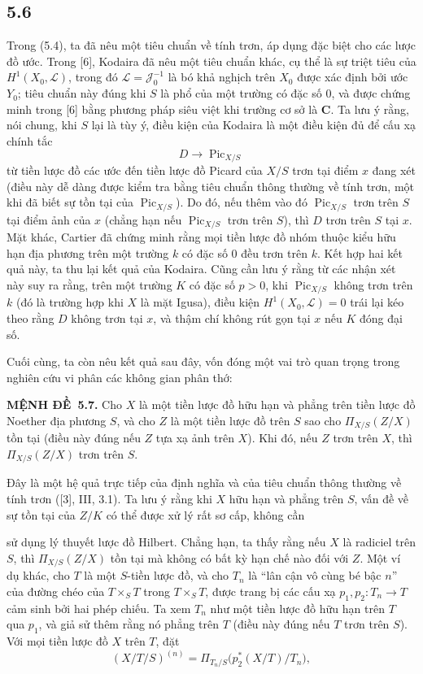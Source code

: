 \documentclass[11pt,twoside,openany]{book}
\numberwithin{equation}{section}
\newcommand{\src}[1]{%
  \phantomsection\hypertarget{src:\fgasourceid:#1}{}%
  \marginpar{\raggedleft\footnotesize\sffamily #1}%
}
\newcommand{\fgasourceid}{unset}
\newcommand{\result}[2]{\par\medskip\noindent\textbf{#1\if\relax\detokenize{#2}\relax\else\ #2\fi.}\quad}
\begin{document}
\subsection*{5.6}

Trong (5.4), ta đã nêu một tiêu chuẩn về tính trơn, áp dụng đặc biệt cho các
lược đồ ước. Trong [6], Kodaira đã nêu một tiêu chuẩn khác, cụ thể là sự triệt
tiêu của $H^1(X_0,\mathcal L)$, trong đó $\mathcal L=\mathcal J_0^{-1}$ là bó
khả nghịch trên $X_0$ được xác định bởi ước $Y_0$; tiêu chuẩn này đúng khi $S$
là phổ của một trường có đặc số 0, và được chứng minh trong [6] bằng phương
pháp siêu việt khi trường cơ sở là $\mathbf C$. Ta lưu ý rằng, nói chung, khi
$S$ lại là tùy ý, điều kiện của Kodaira là một điều kiện đủ để cấu xạ chính tắc
\[
D\longrightarrow\operatorname{Pic}_{X/S}
\]
từ tiền lược đồ các ước đến tiền lược đồ Picard của $X/S$ trơn tại điểm $x$
đang xét (điều này dễ dàng được kiểm tra bằng tiêu chuẩn thông thường về tính
trơn, một khi đã biết sự tồn tại của $\operatorname{Pic}_{X/S}$). Do đó, nếu
thêm vào đó $\operatorname{Pic}_{X/S}$ trơn trên $S$ tại điểm ảnh của $x$
(chẳng hạn nếu $\operatorname{Pic}_{X/S}$ trơn trên $S$), thì $D$ trơn trên
$S$ tại $x$. Mặt khác, Cartier đã chứng minh rằng mọi tiền lược đồ nhóm thuộc
kiểu hữu hạn địa phương trên một trường $k$ có đặc số 0 đều trơn trên $k$. Kết
hợp hai kết quả này, ta thu lại kết quả của Kodaira. Cũng cần lưu ý rằng từ các
nhận xét này suy ra rằng, trên một trường $K$ có đặc số $p>0$, khi
$\operatorname{Pic}_{X/S}$ không trơn trên $k$ (đó là trường hợp khi $X$ là
mặt Igusa), điều kiện $H^1(X_0,\mathcal L)=0$ trái lại kéo theo rằng $D$ không
trơn tại $x$, và thậm chí không rút gọn tại $x$ nếu $K$ đóng đại số.

Cuối cùng, ta còn nêu kết quả sau đây, vốn đóng một vai trò quan trọng trong
nghiên cứu vi phân các không gian phân thớ:

\result{MỆNH ĐỀ}{5.7} Cho $X$ là một tiền lược đồ hữu hạn và phẳng trên tiền
lược đồ Noether địa phương $S$, và cho $Z$ là một tiền lược đồ trên $S$ sao
cho $\Pi_{X/S}(Z/X)$ tồn tại (điều này đúng nếu $Z$ tựa xạ ảnh trên $X$). Khi
đó, nếu $Z$ trơn trên $X$, thì $\Pi_{X/S}(Z/X)$ trơn trên $S$.

Đây là một hệ quả trực tiếp của định nghĩa và của tiêu chuẩn thông thường về
tính trơn ([3], III, 3.1). Ta lưu ý rằng khi $X$ hữu hạn và phẳng trên $S$,
vấn đề về sự tồn tại của
$Z/K$ có thể
được xử lý rất sơ cấp, không cần
\src{273}
sử dụng lý thuyết lược đồ Hilbert. Chẳng hạn, ta thấy rằng nếu $X$ là
radiciel trên $S$, thì $\Pi_{X/S}(Z/X)$ tồn tại mà không có bất kỳ hạn chế nào
đối với $Z$. Một ví dụ khác, cho $T$ là một $S$-tiền lược đồ, và cho $T_n$ là
``lân cận vô cùng bé bậc $n$'' của đường chéo của $T\times_ST$ trong
$T\times_ST$, được trang bị các cấu xạ $p_1,p_2:T_n\longrightarrow T$ cảm
sinh bởi hai phép chiếu. Ta xem $T_n$ như một tiền lược đồ hữu hạn trên $T$
qua $p_1$, và giả sử thêm rằng nó phẳng trên $T$ (điều này đúng nếu $T$ trơn
trên $S$). Với mọi tiền lược đồ $X$ trên $T$, đặt
\[
(X/T/S)^{(n)}=
\Pi_{T_n/S}\bigl(p_2^*(X/T)/T_n\bigr),
\]
\end{document}
